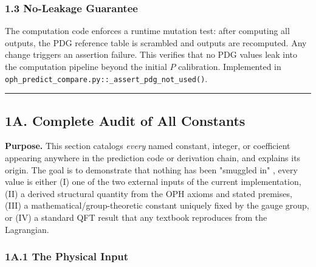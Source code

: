 \subsubsection{1.3 No-Leakage Guarantee}\label{13-no-leakage-guarantee}

The computation code enforces a runtime mutation test: after computing all outputs, the PDG reference table is scrambled and outputs are recomputed. Any change triggers an assertion failure. This verifies that no PDG values leak into the computation pipeline beyond the initial \(P\) calibration. Implemented in \texttt{oph\_predict\_compare.py::\_assert\_pdg\_not\_used()}.

\begin{center}\rule{0.5\linewidth}{0.5pt}\end{center}

\subsection{1A. Complete Audit of All Constants}\label{1a-complete-audit-of-all-constants}

\textbf{Purpose.} This section catalogs \emph{every} named constant, integer, or coefficient appearing anywhere in the prediction code or derivation chain, and explains its origin. The goal is to demonstrate that nothing has been "smuggled in" , every value is either (I) one of the two external inputs of the current implementation, (II) a derived structural quantity from the OPH axioms and stated premises, (III) a mathematical/group-theoretic constant uniquely fixed by the gauge group, or (IV) a standard QFT result that any textbook reproduces from the Lagrangian.

\subsubsection{1A.1 The Physical Input}\label{1a1-the-physical-input}


